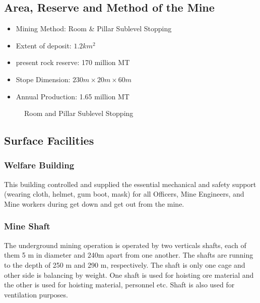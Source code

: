 \documentclass[12pt,a4paper]{article}
\begin{document}
\subsection{Area, Reserve and Method of the Mine}
\begin{itemize}
\item Mining Method: Room \& Pillar Sublevel Stopping
\item Extent of deposit: $1.2 km^2$
\item present rock reserve: 170 million MT
\item Stope Dimension: $230m\times20m\times60m$
\item Annual Production: 1.65 million MT
\end{itemize}
\begin{figure}[ht]
\centering
{}
\caption{Room and Pillar Sublevel Stopping}
\end{figure}

\subsection{Surface Facilities}
\subsubsection{Welfare Building}
This building controlled and supplied the essential mechanical and safety support (wearing cloth, helmet, gum boot, mask) for all Officers, Mine Engineers, and Mine workers during get down and get out from the mine.
\subsubsection{Mine Shaft}
The underground mining operation is operated by two verticals shafts, each of them 5 m in diameter and 240m apart from one another. The shafts are running to the depth of 250 m and 290 m, respectively. The shaft is only one cage and other side is balancing by weight. One shaft is used for hoisting ore material and the other is used for hoisting material, personnel etc. Shaft is also used for ventilation purposes.
\end{document}
